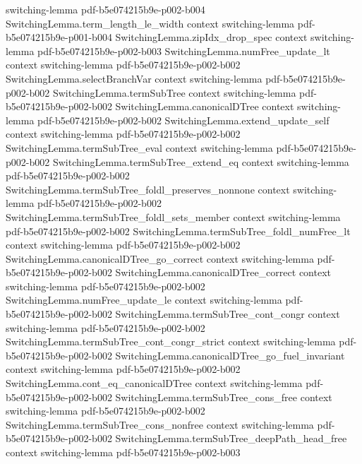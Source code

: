 \begin{lemma}
  {switching-lemma}
  {pdf-b5e074215b9e-p002-b004}
\proofstep
  {SwitchingLemma.term_length_le_width}
  {context}
  {switching-lemma}
  {pdf-b5e074215b9e-p001-b004}
\proofstep
  {SwitchingLemma.zipIdx_drop_spec}
  {context}
  {switching-lemma}
  {pdf-b5e074215b9e-p002-b003}
\proofstep
  {SwitchingLemma.numFree_update_lt}
  {context}
  {switching-lemma}
  {pdf-b5e074215b9e-p002-b002}
\proofstep
  {SwitchingLemma.selectBranchVar}
  {context}
  {switching-lemma}
  {pdf-b5e074215b9e-p002-b002}
\proofstep
  {SwitchingLemma.termSubTree}
  {context}
  {switching-lemma}
  {pdf-b5e074215b9e-p002-b002}
\proofstep
  {SwitchingLemma.canonicalDTree}
  {context}
  {switching-lemma}
  {pdf-b5e074215b9e-p002-b002}
\proofstep
  {SwitchingLemma.extend_update_self}
  {context}
  {switching-lemma}
  {pdf-b5e074215b9e-p002-b002}
\proofstep
  {SwitchingLemma.termSubTree_eval}
  {context}
  {switching-lemma}
  {pdf-b5e074215b9e-p002-b002}
\proofstep
  {SwitchingLemma.termSubTree_extend_eq}
  {context}
  {switching-lemma}
  {pdf-b5e074215b9e-p002-b002}
\proofstep
  {SwitchingLemma.termSubTree_foldl_preserves_nonnone}
  {context}
  {switching-lemma}
  {pdf-b5e074215b9e-p002-b002}
\proofstep
  {SwitchingLemma.termSubTree_foldl_sets_member}
  {context}
  {switching-lemma}
  {pdf-b5e074215b9e-p002-b002}
\proofstep
  {SwitchingLemma.termSubTree_foldl_numFree_lt}
  {context}
  {switching-lemma}
  {pdf-b5e074215b9e-p002-b002}
\proofstep
  {SwitchingLemma.canonicalDTree_go_correct}
  {context}
  {switching-lemma}
  {pdf-b5e074215b9e-p002-b002}
\proofstep
  {SwitchingLemma.canonicalDTree_correct}
  {context}
  {switching-lemma}
  {pdf-b5e074215b9e-p002-b002}
\proofstep
  {SwitchingLemma.numFree_update_le}
  {context}
  {switching-lemma}
  {pdf-b5e074215b9e-p002-b002}
\proofstep
  {SwitchingLemma.termSubTree_cont_congr}
  {context}
  {switching-lemma}
  {pdf-b5e074215b9e-p002-b002}
\proofstep
  {SwitchingLemma.termSubTree_cont_congr_strict}
  {context}
  {switching-lemma}
  {pdf-b5e074215b9e-p002-b002}
\proofstep
  {SwitchingLemma.canonicalDTree_go_fuel_invariant}
  {context}
  {switching-lemma}
  {pdf-b5e074215b9e-p002-b002}
\proofstep
  {SwitchingLemma.cont_eq_canonicalDTree}
  {context}
  {switching-lemma}
  {pdf-b5e074215b9e-p002-b002}
\proofstep
  {SwitchingLemma.termSubTree_cons_free}
  {context}
  {switching-lemma}
  {pdf-b5e074215b9e-p002-b002}
\proofstep
  {SwitchingLemma.termSubTree_cons_nonfree}
  {context}
  {switching-lemma}
  {pdf-b5e074215b9e-p002-b002}
\proofstep
  {SwitchingLemma.termSubTree_deepPath_head_free}
  {context}
  {switching-lemma}
  {pdf-b5e074215b9e-p002-b003}

\end{lemma}
